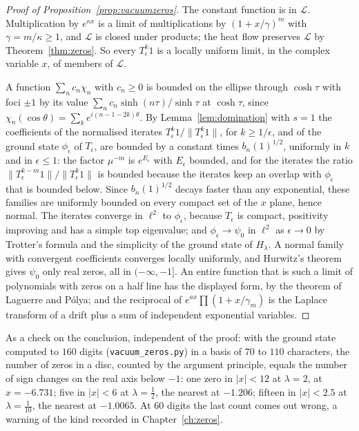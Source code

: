 \begin{proof}[Proof of Proposition~\ref{prop:vacuumzeros}]
The constant function is in $\mathcal L$. Multiplication by $e^{\kappa x}$ is a limit of multiplications by $(1+x/\gamma)^m$ with $\gamma=m/\kappa\ge1$, and $\mathcal L$ is closed under products; the heat flow preserves $\mathcal L$ by Theorem~\ref{thm:zeros}. So every $T_\epsilon^k1$ is a locally uniform limit, in the complex variable $x$, of members of $\mathcal L$.

A function $\sum_nc_n\chi_n$ with $c_n\ge0$ is bounded on the ellipse through $\cosh\tau$ with foci $\pm1$ by its value $\sum_nc_n\sinh(n\tau)/\sinh\tau$ at $\cosh\tau$, since $\chi_n(\cos\theta)=\sum_ke^{i(n-1-2k)\theta}$. By Lemma~\ref{lem:domination} with $s=1$ the coefficients of the normalised iterates $T_\epsilon^k1/\|T_\epsilon^k1\|$, for $k\ge1/\epsilon$, and of the ground state $\phi_\epsilon$ of $T_\epsilon$, are bounded by a constant times $b_n(1)^{1/2}$, uniformly in $k$ and in $\epsilon\le1$: the factor $\mu^{-m}$ is $e^{E_\epsilon}$ with $E_\epsilon$ bounded, and for the iterates the ratio $\|T_\epsilon^{k-m}1\|/\|T_\epsilon^k1\|$ is bounded because the iterates keep an overlap with $\phi_\epsilon$ that is bounded below. Since $b_n(1)^{1/2}$ decays faster than any exponential, these families are uniformly bounded on every compact set of the $x$ plane, hence normal. The iterates converge in $\ell^2$ to $\phi_\epsilon$, because $T_\epsilon$ is compact, positivity improving and has a simple top eigenvalue; and $\phi_\epsilon\to\psi_0$ in $\ell^2$ as $\epsilon\to0$ by Trotter's formula and the simplicity of the ground state of $H_\lambda$. A normal family with convergent coefficients converges locally uniformly, and Hurwitz's theorem gives $\psi_0$ only real zeros, all in $(-\infty,-1]$. An entire function that is such a limit of polynomials with zeros on a half line has the displayed form, by the theorem of Laguerre and P\'olya; and the reciprocal of $e^{ax}\prod(1+x/\gamma_m)$ is the Laplace transform of a drift plus a sum of independent exponential variables.
\end{proof}

As a check on the conclusion, independent of the proof: with the ground state computed to $160$ digits (\texttt{vacuum\_zeros.py}) in a basis of $70$ to $110$ characters, the number of zeros in a disc, counted by the argument principle, equals the number of sign changes on the real axis below $-1$: one zero in $|x|<12$ at $\lambda=2$, at $x=-6.731$; five in $|x|<6$ at $\lambda=\frac12$, the nearest at $-1.206$; fifteen in $|x|<2.5$ at $\lambda=\frac1{10}$, the nearest at $-1.0065$. At $60$ digits the last count comes out wrong, a warning of the kind recorded in Chapter~\ref{ch:zeros}.

